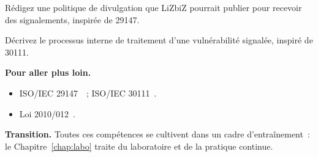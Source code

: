 \begin{boxexo}[title={\ding{45}\quad Exercice~24.9. Politique \niveauexpert}]
Rédigez une politique de divulgation que LiZbiZ pourrait publier pour
recevoir des signalements, inspirée de 29147.
\end{boxexo}

\begin{boxexo}[title={\ding{45}\quad Exercice~24.10. Processus interne \niveauexpert}]
Décrivez le processus interne de traitement d'une vulnérabilité signalée,
inspiré de 30111.
\end{boxexo}

\bigskip

\begin{boxinfo}
\textbf{Pour aller plus loin.}
\begin{itemize}
    \item ISO/IEC 29147~\cite{iso29147}~; ISO/IEC 30111~\cite{iso30111}.
    \item Loi 2010/012~\cite{loi2010012}.
\end{itemize}
\end{boxinfo}

\begin{boxinfo}
\textbf{Transition.} Toutes ces compétences se cultivent dans un cadre
d'entraînement~: le Chapitre~\ref{chap:labo} traite du laboratoire et de la
pratique continue.
\end{boxinfo}
